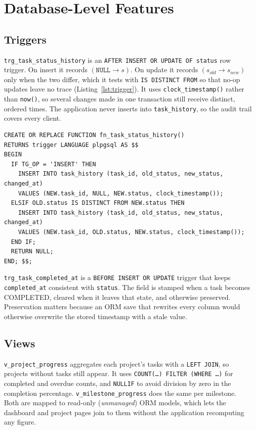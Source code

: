 \documentclass[conference]{IEEEtran}
\begin{document}
\section{Database-Level Features}
\label{sec:dbfeatures}

\subsection{Triggers}

\texttt{trg\_task\_status\_history} is an \texttt{AFTER INSERT OR UPDATE OF
status} row trigger. On insert it records $(\texttt{NULL}\rightarrow s)$. On
update it records $(s_{old}\rightarrow s_{new})$ only when the two differ, which
it tests with \texttt{IS DISTINCT FROM} so that no-op updates leave no trace
(Listing~\ref{lst:trigger}). It uses \texttt{clock\_timestamp()} rather than
\texttt{now()}, so several changes made in one transaction still receive
distinct, ordered times. The application never inserts into
\texttt{task\_history}, so the audit trail covers every client.

\begin{lstlisting}[style=code,float=tb,language=PGSQL,caption={Status-history trigger function},label={lst:trigger}]
CREATE OR REPLACE FUNCTION fn_task_status_history()
RETURNS trigger LANGUAGE plpgsql AS $$
BEGIN
  IF TG_OP = 'INSERT' THEN
    INSERT INTO task_history (task_id, old_status, new_status, changed_at)
    VALUES (NEW.task_id, NULL, NEW.status, clock_timestamp());
  ELSIF OLD.status IS DISTINCT FROM NEW.status THEN
    INSERT INTO task_history (task_id, old_status, new_status, changed_at)
    VALUES (NEW.task_id, OLD.status, NEW.status, clock_timestamp());
  END IF;
  RETURN NULL;
END; $$;
\end{lstlisting}

\texttt{trg\_task\_completed\_at} is a \texttt{BEFORE INSERT OR UPDATE} trigger
that keeps \texttt{completed\_at} consistent with \texttt{status}. The field is
stamped when a task becomes COMPLETED, cleared when it leaves that state, and
otherwise preserved. Preservation matters because an ORM save that rewrites
every column would otherwise overwrite the stored timestamp with a stale value.

\subsection{Views}

\texttt{v\_project\_progress} aggregates each project's tasks with a
\texttt{LEFT JOIN}, so projects without tasks still appear. It uses
\texttt{COUNT(\ldots) FILTER (WHERE \ldots)} for completed and overdue counts,
and \texttt{NULLIF} to avoid division by zero in the completion percentage.
\texttt{v\_milestone\_progress} does the same per milestone. Both are mapped to
read-only (\emph{unmanaged}) ORM models, which lets the dashboard and project
pages join to them without the application recomputing any figure.
\end{document}
